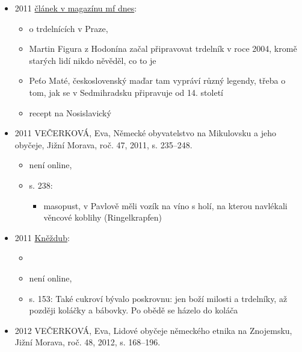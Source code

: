 \begin{itemize}
  \begin{itemize}
  \tightlist
  \item
    není online, 
  \item
    Marie Lekešová
  \item
    město u Uherského Hradiště
  \item
    v obsahu je trdleník mezi fašankovýma jídlama, s. 49
  \end{itemize}
\item
  2011
  \href{https://ndk.cz/view/uuid:cc17ef80-fa5e-11e7-9854-5ef3fc9ae867?page=uuid\%3A5f880b20-fa6d-11e7-9854-5ef3fc9ae867}{článek
  v magazínu mf dnes}:

  \begin{itemize}
  \tightlist
  \item
    o trdelnících v Praze,
  \item
    Martin Figura z Hodonína začal připravovat trdelník v roce 2004,
    kromě starých lidí nikdo něvěděl, co to je
  \item
    Peťo Maté, československý maďar tam vypráví různý legendy, třeba o
    tom, jak se v Sedmihradsku připravuje od 14. století
  \item
    recept na Nosislavický
  \end{itemize}
\item
  2011 VEČERKOVÁ, Eva, Německé obyvatelstvo na Mikulovsku a jeho
  obyčeje, Jižní Morava, roč. 47, 2011, s. 235--248.

  \begin{itemize}
  \tightlist
  \item
    není online,
  \item
    s. 238:

    \begin{itemize}
    \tightlist
    \item
      masopust, v Pavlově měli vozík na víno s holí, na kterou navlékali
      věncové koblihy (Ringelkrapfen)
    \end{itemize}
  \end{itemize}
\item
  2011
  \href{https://www.digitalniknihovna.cz/mzk/uuid/uuid:26360810-f1fb-11e7-a97b-005056827e51}{Kněždub}:

  \begin{itemize}
  \tightlist
  \item
     
  \item
    není online, 
  \item
    s. 153: Také cukroví bývalo poskrovnu: jen boží milosti a trdelníky,
    až později koláčky a bábovky. Po obědě se házelo do koláča
  \end{itemize}
\item
  2012 VEČERKOVÁ, Eva, Lidové obyčeje německého etnika na Znojemsku,
  Jižní Morava, roč. 48, 2012, s. 168--196.


\end{itemize}
